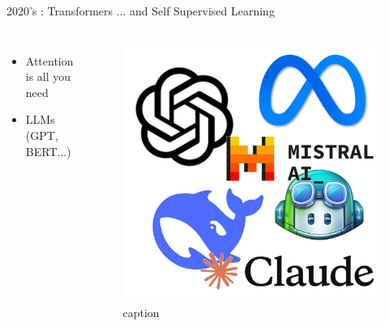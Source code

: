 \documentclass{irdbeamer}
\let\oldcite=\cite
\renewcommand{\cite}[1]{\textcolor[rgb]{.5,.5,.7}{\oldcite{#1}}}
\begin{document}
\begin{frame}[t]{2020's : Transformers ... and Self Supervised Learning}
\begin{columns}[t]
    \vspace{1cm}
    \begin{itemize}
        \item Attention is all you need\\ \cite{vaswani2017attention}
        \item LLMs (GPT, BERT...)\\ \cite{devlin2019bert}
    \end{itemize}
    \begin{figure}
        \centering
        \includegraphics[width=.7\linewidth]{figs/llms.png}
        \caption{\tiny caption}
    \end{figure}
\end{columns}
\end{frame} 
\end{document}
